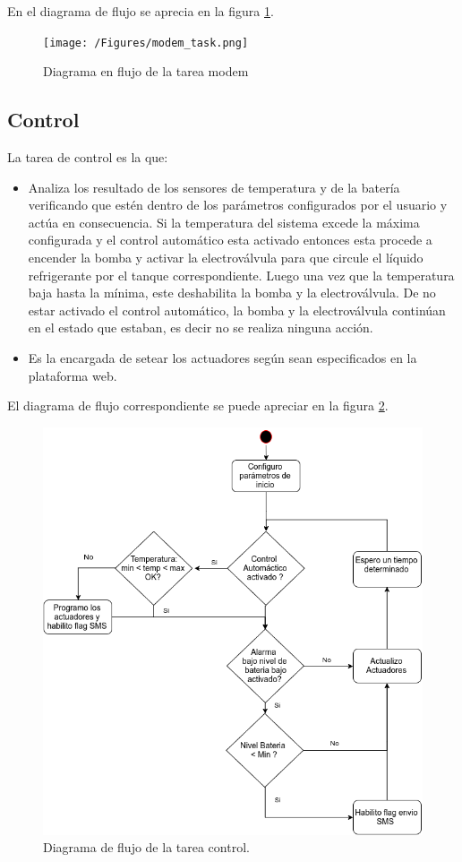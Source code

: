   En el diagrama de flujo se aprecia en la figura \ref{fig:modem_task}.

  \begin{figure}[!htp]
    \texttt{[image: /Figures/modem\_task.png]}
    \caption{Diagrama en flujo de la tarea modem}
    \label{fig:modem_task}
\end{figure}


\subsection*{Control}
La tarea de control es la que:
  
\begin{itemize}
  \item Analiza los resultado de los sensores de temperatura y de la batería verificando que estén dentro de los parámetros configurados por el usuario y actúa en consecuencia. Si la temperatura del sistema excede la máxima configurada y el control automático esta activado entonces esta procede a encender la bomba y activar la electroválvula para que circule el líquido refrigerante por el tanque correspondiente. Luego una vez que la temperatura baja hasta la mínima, este deshabilita la bomba y la electroválvula. De no estar activado el control automático, la bomba y la electroválvula continúan en el estado que estaban, es decir no se realiza ninguna acción.
  \item Es la encargada de setear los actuadores según sean especificados en la plataforma web.
\end{itemize}

El diagrama de flujo correspondiente se puede apreciar en la figura \ref{fig:control_task}.
\begin{figure}[hp]
  \includegraphics[scale=.5]{./Figures/control_task.png}
  \caption{Diagrama de flujo de la tarea control.}
  \label{fig:control_task}
\end{figure}


